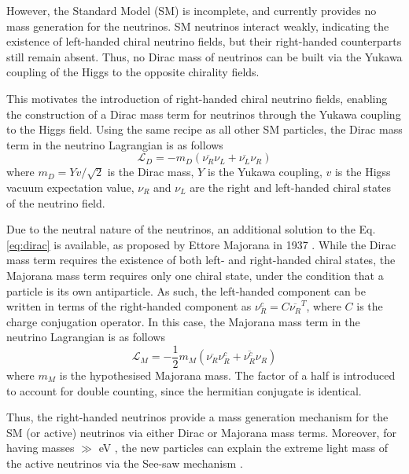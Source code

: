 However, the Standard Model (SM) is incomplete, and currently provides no mass generation for the neutrinos.
SM neutrinos interact weakly, indicating the existence of left-handed chiral neutrino fields, but their right-handed counterparts still remain absent. 
Thus, no Dirac mass of neutrinos can be built via the Yukawa coupling of the Higgs to the opposite chirality fields. 

This motivates the introduction of right-handed chiral neutrino fields, enabling the construction of a Dirac mass term for neutrinos through the Yukawa coupling to the Higgs field.
Using the same recipe as all other SM particles, the Dirac mass term in the neutrino Lagrangian is as follows \cite{Thomson}
\begin{equation}
\mathcal{L}_{D} = -m_{D} (\overline{\nu_{R}}\nu_{L} + \overline{\nu_{L}}\nu_{R}) 
\label{eq:dirac}
\end{equation}
where $m_{D} = Yv/\sqrt{2}$ is the Dirac mass, $Y$ is the Yukawa coupling, $v$ is the Higss vacuum expectation value, $\nu_{R}$ and $\nu_{L}$ are the right and left-handed chiral states of the neutrino field.

Due to the neutral nature of the neutrinos, an additional solution to the Eq. \ref{eq:dirac} is available, as proposed by Ettore Majorana in 1937 \cite{Majorana}.
While the Dirac mass term requires the existence of both left- and right-handed chiral states, the Majorana mass term requires only one chiral state, under the condition that a particle is its own antiparticle.
As such, the left-handed component can be written in terms of the right-handed component as $\nu^{c}_{R}=C\overline{\nu_{R}}^{T}$, where $C$ is the charge conjugation operator.
In this case, the Majorana mass term in the neutrino Lagrangian is as follows \cite{Thomson}
\begin{equation}
	\mathcal{L}_{M} = -\frac{1}{2}m_{M}(\overline{\nu_{R}}\nu_{R}^{c} + \overline{\nu_{R}^{c}}\nu_{R})
\end{equation}
where $m_{M}$ is the hypothesised Majorana mass. 
The factor of a half is introduced to account for double counting, since the hermitian conjugate is identical.

Thus, the right-handed neutrinos provide a mass generation mechanism for the SM (or active) neutrinos via either Dirac or Majorana mass terms.
Moreover, for having masses $\gg$ eV , the new particles can explain the extreme light mass of the active neutrinos via the See-saw mechanism \cite{nuMass}.


